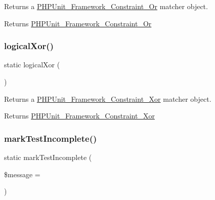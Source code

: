 Returns a \mbox{\hyperlink{class_p_h_p_unit___framework___constraint___or}{P\+H\+P\+Unit\+\_\+\+Framework\+\_\+\+Constraint\+\_\+\+Or}} matcher object.

\begin{DoxyReturn}{Returns}
\mbox{\hyperlink{class_p_h_p_unit___framework___constraint___or}{P\+H\+P\+Unit\+\_\+\+Framework\+\_\+\+Constraint\+\_\+\+Or}} 
\end{DoxyReturn}
\mbox{\label{class_p_h_p_unit___framework___assert_a0f77135dbe17ae91c6d9a47cd614d05d}} 
\subsubsection{\texorpdfstring{logical\+Xor()}{logicalXor()}}
{\footnotesize\ttfamily static logical\+Xor (\begin{DoxyParamCaption}{ }\end{DoxyParamCaption})\hspace{0.3cm}{\ttfamily [static]}}

Returns a \mbox{\hyperlink{class_p_h_p_unit___framework___constraint___xor}{P\+H\+P\+Unit\+\_\+\+Framework\+\_\+\+Constraint\+\_\+\+Xor}} matcher object.

\begin{DoxyReturn}{Returns}
\mbox{\hyperlink{class_p_h_p_unit___framework___constraint___xor}{P\+H\+P\+Unit\+\_\+\+Framework\+\_\+\+Constraint\+\_\+\+Xor}} 
\end{DoxyReturn}
\mbox{\label{class_p_h_p_unit___framework___assert_ad7ee58b22c15c758237dcccae4a8c1c4}} 
\subsubsection{\texorpdfstring{mark\+Test\+Incomplete()}{markTestIncomplete()}}
{\footnotesize\ttfamily static mark\+Test\+Incomplete (\begin{DoxyParamCaption}\item[{}]{\$message = {\ttfamily \textquotesingle{}\textquotesingle{}} }\end{DoxyParamCaption})\hspace{0.3cm}{\ttfamily [static]}}

